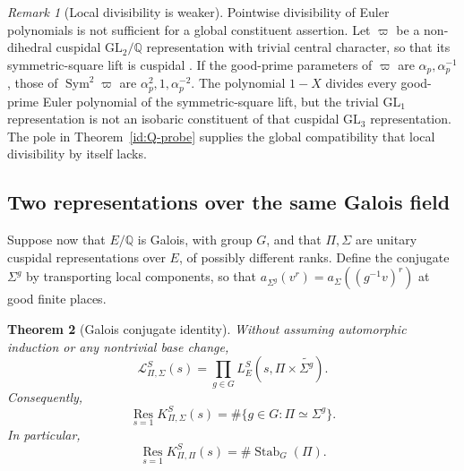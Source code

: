 \documentclass[11pt,reqno]{amsart}
\numberwithin{equation}{section}
\newtheorem{theorem}{Theorem}[section]
\theoremstyle{definition}
\theoremstyle{remark}
\newtheorem{remark}[theorem]{Remark}
\newcommand{\Q}{\mathbb Q}
\begin{document}
\begin{remark}[Local divisibility is weaker]\label{id:divisibility-warning}
Pointwise divisibility of Euler polynomials is not sufficient for a global
constituent assertion. Let $\varpi$ be a non-dihedral cuspidal
$\mathrm{GL}_2/\Q$ representation with trivial central character, so that
its symmetric-square lift is cuspidal \cite{GJ}. If the good-prime
parameters of $\varpi$ are $\alpha_p,\alpha_p^{-1}$, those of
$\operatorname{Sym}^2\varpi$ are
$\alpha_p^2,1,\alpha_p^{-2}$. The polynomial $1-X$ divides every good-prime
Euler polynomial of the symmetric-square lift, but the trivial
$\mathrm{GL}_1$ representation is not an isobaric constituent of that
cuspidal $\mathrm{GL}_3$ representation. The pole in
Theorem~\ref{id:Q-probe} supplies the global compatibility that local
divisibility by itself lacks.
\end{remark}

\subsection{Two representations over the same Galois field}
Suppose now that $E/\Q$ is Galois, with group $G$, and that $\Pi,\Sigma$
are unitary cuspidal representations over $E$, of possibly different
ranks. Define the conjugate $\Sigma^g$ by transporting local components,
so that
$a_{\Sigma^g}(v^r)=a_\Sigma((g^{-1}v)^r)$ at good finite places.

\begin{theorem}[Galois conjugate identity]\label{id:Galois-identity-thm}
Without assuming automorphic induction or any nontrivial base change,
\begin{equation}\label{id:Galois-identity}
 \mathscr L_{\Pi,\Sigma}^S(s)=
 \prod_{g\in G}L_E^S(s,\Pi\times\widetilde{\Sigma^g}).
\end{equation}
Consequently,
\begin{equation}\label{id:Galois-residue}
 \operatorname*{Res}_{s=1}K_{\Pi,\Sigma}^S(s)
 =\#\{g\in G:\Pi\simeq\Sigma^g\}.
\end{equation}
In particular,
\begin{equation}\label{id:stabilizer}
 \operatorname*{Res}_{s=1}K_{\Pi,\Pi}^S(s)
 =\#\operatorname{Stab}_G(\Pi).
\end{equation}
\end{theorem}
\end{document}
